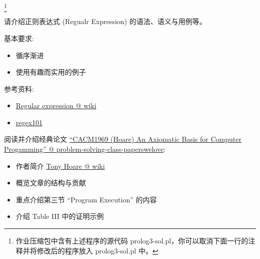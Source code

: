 \documentclass[a4paper, justified]{tufte-handout}
\begin{document}
\begin{solution}
  \footnote{作业压缩包中含有上述程序的源代码 prolog3-sol.pl，你可以取消下面一行的注释并将修改后的程序放入 prolog3-sol.pl 中。}

  
\end{solution}





\beginot

\begin{ot}[正则表达式]
  请介绍正则表达式 (Regualr Expression) 的语法、语义与用例等。

  \noindent 基本要求:
  \begin{itemize}
    \item 循序渐进
    \item 使用有趣而实用的例子
  \end{itemize}

  \noindent 参考资料:
  \begin{itemize}
    \item \href{https://en.wikipedia.org/wiki/Regular\_expression}{Regular expression @ wiki}
    \item \href{https://regex101.com/}{regex101}
  \end{itemize}
\end{ot}

\vspace{0.50cm}
\begin{ot}[程序设计语言的语义]
  阅读并介绍经典论文
  \href{https://github.com/hengxin/problem-solving-class-paperswelove/tree/master/1st-semester}{``CACM1969 (Hoare) An Axiomatic Basis for Computer Progamming'' @ problem-solving-class-paperswelove}:

  \begin{itemize}
    \item 作者简介 \href{https://en.wikipedia.org/wiki/Tony\_Hoare}{Tony Hoare @ wiki}
    \item 概览文章的结构与贡献
    \item 重点介绍第三节 ``Program Execution'' 的内容
    \item 介绍 Table III 中的证明示例
  \end{itemize}
\end{ot}
\end{document}

